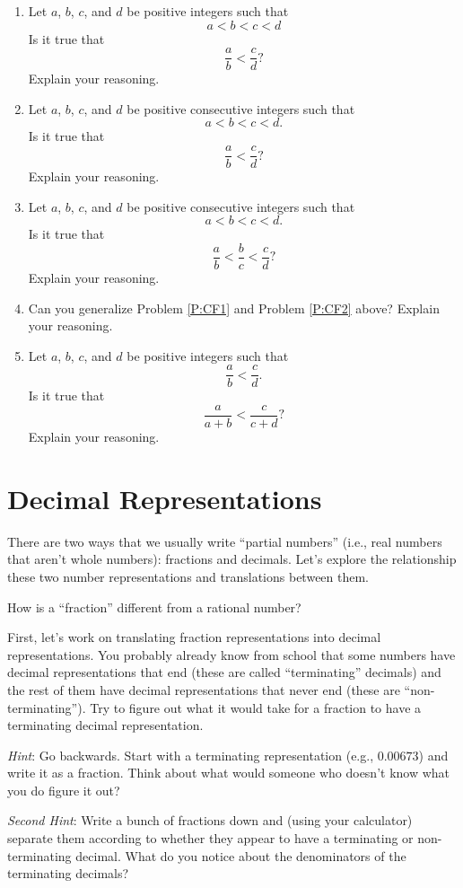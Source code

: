 \begin{problems}
\begin{enumerate}
\item Let $a$, $b$, $c$, and $d$ be positive integers such that 
\[
a<b<c<d
\]
Is it true that 
\[
\frac{a}{b}<\frac{c}{d}?
\]
Explain your reasoning.
\item\label{P:CF1} Let $a$, $b$, $c$, and $d$ be positive consecutive
  integers such that
\[
a<b<c<d.
\]
Is it true that 
\[
\frac{a}{b}<\frac{c}{d}?
\]
Explain your reasoning.
\item\label{P:CF2} Let $a$, $b$, $c$, and $d$ be positive consecutive
  integers such that
\[
a<b<c<d.
\]
Is it true that 
\[
\frac{a}{b}<\frac{b}{c}<\frac{c}{d}?
\]
Explain your reasoning.
\item Can you generalize Problem \ref{P:CF1} and Problem \ref{P:CF2}
  above? Explain your reasoning.
\item Let $a$, $b$, $c$, and $d$ be positive integers such that 
\[
\frac{a}{b}<\frac{c}{d}.
\]
Is it true that 
\[
\frac{a}{a+b}<\frac{c}{c+d}?
\]
Explain your reasoning.
\end{enumerate}
\end{problems}

\section{Decimal Representations}

There are two ways that we usually write ``partial numbers'' (i.e., real numbers that aren't whole numbers):  fractions and decimals.  Let's explore the relationship these two number representations and translations between them.  

\begin{question} How is a ``fraction'' different from a rational number?  
\end{question}
\QM

First, let's work on translating fraction representations into decimal representations.  You probably already know from school that some numbers have decimal representations that end (these are called ``terminating'' decimals) and the rest of them have decimal representations that never end (these are ``non-terminating'').  Try to figure out what it would take for a fraction to have a terminating decimal representation.  

\emph{Hint}:  Go backwards.  Start with a terminating representation (e.g., $0.00673$) and write it as a fraction.  Think about what would someone who doesn't know what you do figure it out?

\emph{Second Hint}:  Write a bunch of fractions down and (using your calculator) separate them according to whether they appear to have a terminating or non-terminating decimal.  What do you notice about the denominators of the terminating decimals?

